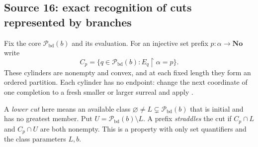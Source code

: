 \documentclass[11pt]{article}
\theoremstyle{definition}
\theoremstyle{remark}
\newcommand{\No}{\mathbf{No}}
\newcommand{\Pbd}{\mathcal P_{\mathrm{bd}}}
\newcommand{\res}{\mathbin{\upharpoonright}}
\begin{document}
\subsection{Source 16: exact recognition of cuts represented by branches}\label{swo:ds:sec:cutrecognition}

Fix the core $\Pbd(b)$ and its evaluation. For an injective set prefix
$p:\alpha\to\No$ write
\[
 C_p=\{q\in \Pbd(b):E_q\res\alpha=p\}.
\]
These cylinders are nonempty and convex, and at each fixed length they
form an ordered partition. Each cylinder has no endpoint: change the
next coordinate of one completion to a fresh smaller or larger surreal
and apply .

A \emph{lower cut} here means an available class
$\varnothing\ne L\subsetneq \Pbd(b)$ that is initial and has no greatest
member. Put $U=\Pbd(b)\setminus L$. A prefix \emph{straddles} the cut if
$C_p\cap L$ and $C_p\cap U$ are both nonempty. This is a property with
only set quantifiers and the class parameters $L,b$.
\end{document}
